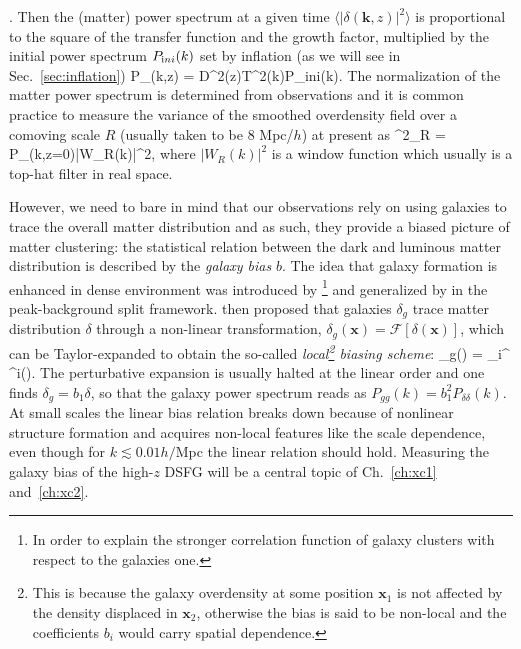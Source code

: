 \cite{Bardeen1986,Eisenstein1998}. Then the (matter) power spectrum at a given time
$\langle |\delta(\bm{k},z)|^2\rangle$ is 
proportional to the square of the transfer function and the growth factor, multiplied by the initial power 
spectrum $P_{\rm ini}(k)$ set by inflation (as we will see in Sec.~\eqref{sec:inflation})
%
\be
\label{eq:pk}
P_{\delta\delta}(k,z) = D^2(z)T^2(k)P_{\rm ini}(k).
\ee
%
The normalization of the matter power spectrum is determined from observations and it is common 
practice to measure the variance of the smoothed overdensity field over a comoving scale $R$ 
(usually taken to be 8 Mpc/$h$) at present as 
%
\be
\sigma^2_R = \int {}P_{\delta\delta}(k,z=0)|W_R(k)|^2, 
\ee
%
where $|W_R(k)|^2$ is a window function which usually is a top-hat filter in real space.
 
However, we need
to bare in mind that our observations rely on using galaxies to trace the overall matter distribution and as 
such, they provide a biased picture of matter clustering: the statistical relation between the dark and 
luminous matter distribution is described by the \emph{galaxy bias} $b$. The idea that galaxy formation  is 
enhanced in dense environment was introduced by \citet{Kaiser1984}\footnote{In order to explain the 
stronger correlation function of galaxy clusters with respect to the galaxies one.} and generalized by \citet{Bardeen1986,Sheth1999} in the peak-background split framework. \cite{Fry1993} then proposed that
galaxies $\delta_g$ trace matter distribution $\delta$ through a non-linear transformation, 
$\delta_g(\bm{x}) = \mathcal{F}[\delta(\bm{x})]$, which can be Taylor-expanded to obtain the so-called
\emph{local\footnote{This is because the galaxy overdensity at some position $\bm{x}_1$ is not affected
by the density displaced in $\bm{x}_2$, otherwise the bias is said to be non-local and the coefficients $b_i$ would carry spatial dependence.} biasing scheme}:
%
\be
\label{eq:bias}
\delta_g() = \sum_{i}^{\infty} \delta^i().
\ee
%
The perturbative expansion is usually halted at the linear order and one finds $\delta_g = b_1 \delta$, so 
that the galaxy power spectrum reads as $P_{gg}(k) = b_1^2 P_{\delta\delta}(k)$. At small 
scales the linear bias relation breaks down because of nonlinear structure formation and acquires 
non-local features like the scale dependence, even though for $k\lesssim 0.01 h/$Mpc the linear relation should hold. 
Measuring the galaxy bias of the high-$z$ \gls{DSFG} will be a central topic of Ch.~\eqref{ch:xc1} and~\eqref{ch:xc2}.  

